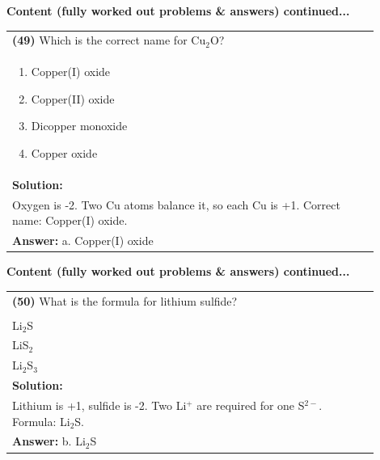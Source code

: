 \documentclass{article}
\begin{document}
\newpage
\noindent
{\large\textbf{Content (fully worked out problems \& answers) continued...}}\\[0.2em]
\vspace{0.2cm}
\begin{tabular}{|p{0.9\linewidth}|}
\hline
\vspace{0.2cm}
\textbf{(49)} Which is the correct name for $\text{Cu}_2\text{O}$? \\
\begin{minipage}[t]{0.85\linewidth}
\begin{enumerate}[label=\alph*.]
\item Copper(I) oxide \
\item Copper(II) oxide \
\item Dicopper monoxide \
\item Copper oxide
\end{enumerate}
\end{minipage}\\
\hline
\vspace{0.2cm}
\textbf{Solution:} \\
Oxygen is -2. Two Cu atoms balance it, so each Cu is +1. Correct name: Copper(I) oxide. \\
\hline
\vspace{0.2cm}
\textbf{Answer:} a. Copper(I) oxide \
\hline
\end{tabular}

\newpage
\noindent
{\large\textbf{Content (fully worked out problems \& answers) continued...}}\\[0.2em]

\begin{tabular}{|p{0.9\linewidth}|}
\hline
\vspace{0.2cm}
\textbf{(50)} What is the formula for lithium sulfide? \\
\begin{minipage}[t]{0.85\linewidth}
\begin{enumerate}[label=\alph*.]
\item LiS \\
\item Li$_2$S \\
\item LiS$_2$ \\
\item Li$_2$S$_3$
\end{enumerate}
\end{minipage}\\
\hline
\vspace{0.2cm}
\textbf{Solution:} \\
Lithium is +1, sulfide is -2. Two Li$^{+}$ are required for one S$^{2-}$. Formula: Li$_2$S. \\
\hline
\vspace{0.2cm}
\textbf{Answer:} b. Li$_2$S \\
\hline
\end{tabular}
\end{document}
